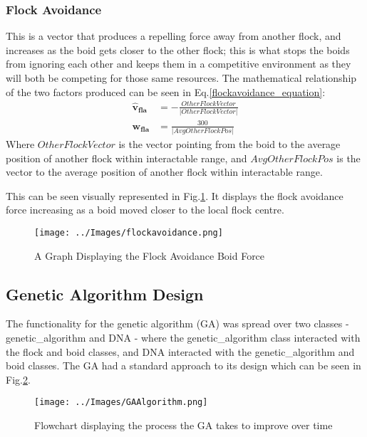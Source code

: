 \subsubsection{Flock Avoidance}
This is a vector that produces a repelling force away from another flock, and increases as the boid gets closer to the other flock; this is what stops the boids from ignoring each other and keeps them in a competitive environment as they will both be competing for those same resources. The mathematical relationship of the two factors produced can be seen in Eq.\ref{flockavoidance_equation}:
\begin{equation}
\begin{split}
\boldsymbol{\hat{v}_{fla}} &= -\frac{OtherFlockVector} {|OtherFlockVector|} \\
\boldsymbol{w_{fla}} &= \frac{300} {|AvgOtherFlockPos|}
\end{split}
\label{flockavoidance_equation}
\end{equation}
Where $OtherFlockVector$ is the vector pointing from the boid to the average position of another flock within interactable range, and $AvgOtherFlockPos$ is the vector to the average position of another flock within interactable range.

This can be seen visually represented in Fig.\ref{fig:flockavoidance}. It displays the flock avoidance force increasing as a boid moved closer to the local flock centre.
\begin{figure}
	\texttt{[image: ../Images/flockavoidance.png]}
	\caption{A Graph Displaying the Flock Avoidance Boid Force}
	\label{fig:flockavoidance}
\end{figure}


\subsection{Genetic Algorithm Design}
The functionality for the genetic algorithm (GA) was spread over two classes - genetic\_algorithm and DNA - where the genetic\_algorithm class interacted with the flock and boid classes, and DNA interacted with the genetic\_algorithm and boid classes. The GA had a standard approach to its design which can be seen in Fig.\ref{fig:geneticflow}.
\begin{figure}
	\texttt{[image: ../Images/GAAlgorithm.png]}
	\caption{Flowchart displaying the process the GA takes to improve over time}
	\label{fig:geneticflow}
\end{figure}

